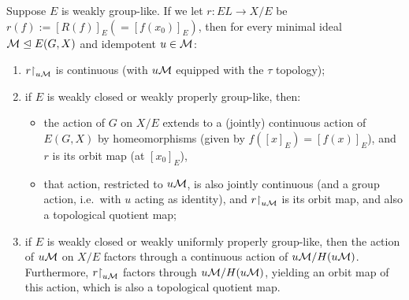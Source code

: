	\begin{lem}
		\label{lem:weakly_grouplike}
		Suppose $E$ is weakly group-like. If we let $r\colon EL\to X/E$ be $r(f):=[R(f)]_E(=[f(x_0)]_E)$, then for every minimal ideal ${\mathcal M}\trianglelefteq E(G,X)$ and idempotent $u\in {\mathcal M}$:
		\begin{enumerate}
			\item
			$r\mathord{\upharpoonright}_{u{\mathcal M}}$ is continuous (with $u{\mathcal M}$ equipped with the $\tau$ topology);
			\item
			if $E$ is weakly closed or weakly properly group-like, then:
			\begin{itemize}
				\item
				the action of $G$ on $X/E$ extends to a (jointly) continuous action of $E(G,X)$ by homeomorphisms (given by $f([x]_E)=[f(x)]_E$), and $r$ is its orbit map (at $[x_0]_E$),
				\item
				that action, restricted to $u{\mathcal M}$, is also jointly continuous (and a group action, i.e.\ with $u$ acting as identity), and $r\mathord{\upharpoonright}_{u{\mathcal M}}$ is its orbit map, and also a topological quotient map;
			\end{itemize}
			\item
			if $E$ is weakly closed or weakly uniformly properly group-like, then the action of ${u{\mathcal M}}$ on $X/E$ factors through a continuous action of ${u{\mathcal M}}/H(u{\mathcal M})$. Furthermore, $r\mathord{\upharpoonright}_{u{\mathcal M}}$ factors through $u{\mathcal M}/H(u{\mathcal M})$, yielding an orbit map of this action, which is also a topological quotient map.
		\end{enumerate}
	\end{lem}
